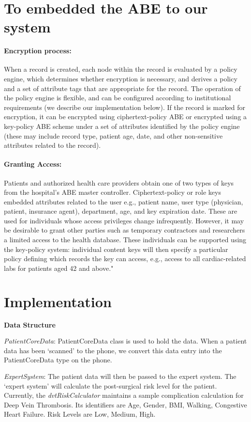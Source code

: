 \documentclass[11pt]{article}
\begin{document}
\section{To embedded the ABE to our system}
\paragraph{Encryption process:} When a record is created, each node within the record is evaluated by a policy
engine, which determines whether encryption is necessary, and derives a policy and a set of attribute tags
that are appropriate for the record. The operation of the policy engine is flexible, and can be configured according to institutional requirements (we describe our implementation below). If the record
is marked for encryption, it can be encrypted using ciphertext-policy ABE or encrypted using a key-policy ABE scheme under a set of attributes identified by the policy engine (these may include record type, patient age, date, and other non-sensitive attributes related to the record).

\paragraph{Granting Access:} Patients and authorized health care providers obtain one of two types of keys from
the hospital's ABE master controller. Ciphertext-policy or role keys embedded attributes related to the user e.g., patient name, user type (physician, patient, insurance agent), department, age, and key expiration date. These are used for individuals whose access privileges change infrequently. However, it may be desirable to grant other parties such as temporary contractors and researchers a limited access to
the health database. These individuals can be supported using the key-policy system: individual content keys will then specify a particular policy defining which records the key can access, e.g., access to all cardiac-related labs for patients aged 42 and above."

\newpage
\section{Implementation}
\textbf{Data Structure}

\emph{PatientCoreData}: PatientCoreData class is used to hold the data. When a patient data has been `scanned' to the phone, we convert this data entry into the PatientCoreData type on the phone.

\emph{ExpertSystem}: The patient data will then be passed to the expert system. The `expert system' will calculate the post-surgical risk level for the patient. Currently, the \emph{dvtRiskCalculator} maintains a sample complication calculation for Deep Vein Thrombosis. Its identifiers are Age, Gender, BMI, Walking, Congestive Heart Failure. Risk Levels are Low, Medium, High.
\end{document}
